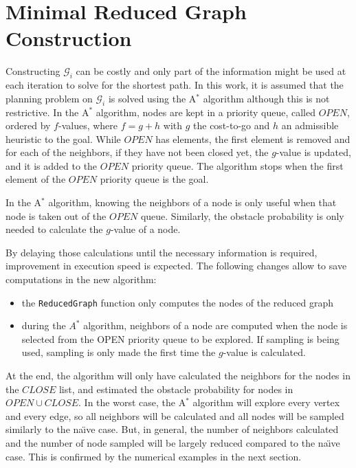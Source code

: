 \documentclass[letterpaper, 10 pt, conference]{ieeeconf}
\theoremstyle{definition}
\begin{document}
\section{Minimal Reduced Graph Construction}

Constructing $\mathcal{G}_i$ can be costly and only part of the information might be used at each iteration to solve for the shortest path.
In this work, it is assumed that the planning problem on $\mathcal{G}_i$ is solved using the A$^*$ algorithm although this is not restrictive.
In the A$^*$ algorithm, nodes are kept in a priority queue, called $OPEN$, ordered by $f$-values, where $f=g+h$ with $g$ the cost-to-go and $h$ an admissible heuristic to the goal. While $OPEN$ has elements, the first element is removed and for each of the neighbors, if they have not been closed yet, the $g$-value is updated, and it is added to the $OPEN$ priority queue. The algorithm stops when the first element of the $OPEN$ priority queue is the goal.

In the A$^*$ algorithm, knowing the neighbors of a node is only useful when that node is taken out of the $OPEN$ queue.
Similarly, the obstacle probability is only needed to calculate the {$g$-value} of a node.

By delaying those calculations until the necessary information is required, improvement in execution speed is expected. The following changes allow to save computations in the new algorithm:

\begin{itemize}
\item the {\tt ReducedGraph} function only computes the nodes of the reduced graph
\item during the $A^*$ algorithm, neighbors of a node are computed when the node is selected from the OPEN priority queue to be explored. If sampling is being used, sampling is only made the first time the $g$-value is calculated.
\end{itemize}

At the end, the algorithm will only have calculated the neighbors for the nodes in the $CLOSE$ list, and estimated the obstacle probability for nodes in $OPEN \cup CLOSE$.
In the worst case, the A$^*$ algorithm will explore every vertex and every edge, so all neighbors will be calculated and all nodes will be sampled similarly to the na\"{\i}ve case. But, in general, the number of neighbors calculated and the number of node sampled will be largely reduced compared to the na\"{\i}ve case.
This is confirmed by the numerical examples in the next section.
\end{document}
